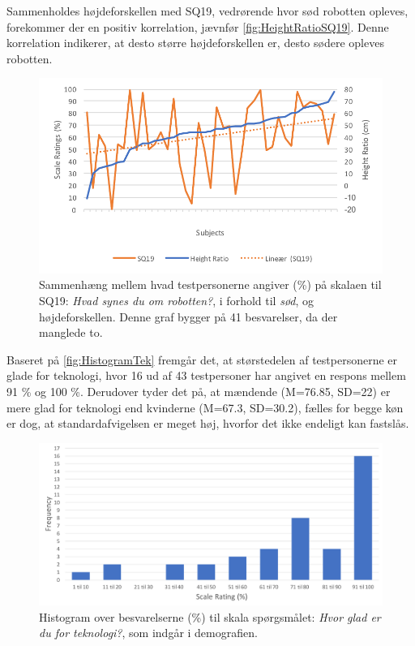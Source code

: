 \noindent
%
Sammenholdes højdeforskellen med SQ19, vedrørende hvor sød robotten opleves, forekommer der en positiv korrelation, jævnfør \autoref{fig:HeightRatioSQ19}. Denne korrelation indikerer, at desto større højdeforskellen er, desto sødere opleves robotten. 
\newpage
%
\begin{figure}[H]
\centering
\includegraphics[width=\textwidth]{Figure/DatabehandlingSkalaer/Demografi/HeightRatioSQ19}
\caption{Sammenhæng mellem hvad testpersonerne angiver (\%) på skalaen til SQ19: \textit{Hvad synes du om robotten?}, i forhold til \textit{sød}, og højdeforskellen. Denne graf bygger på 41 besvarelser, da der manglede to.}
\label{fig:HeightRatioSQ19}
\end{figure}
\noindent
%
Baseret på \autoref{fig:HistogramTek} fremgår det, at størstedelen af testpersonerne er glade for teknologi, hvor 16 ud af 43 testpersoner har angivet en respons mellem 91 \% og 100 \%. Derudover tyder det på, at mændende (M=76.85, SD=22) er mere glad for teknologi end kvinderne (M=67.3, SD=30.2), fælles for begge køn er dog, at standardafvigelsen er meget høj, hvorfor det ikke endeligt kan fastslås. 
%
\begin{figure}[H]
\centering
\includegraphics[width = \textwidth]{Figure/DatabehandlingSkalaer/DataPresentation/HistogramTek} 
\caption{Histogram over besvarelserne (\%) til skala spørgsmålet: \textit{Hvor glad er du for teknologi?}, som indgår i demografien.}
\label{fig:HistogramTek}
\end{figure}
